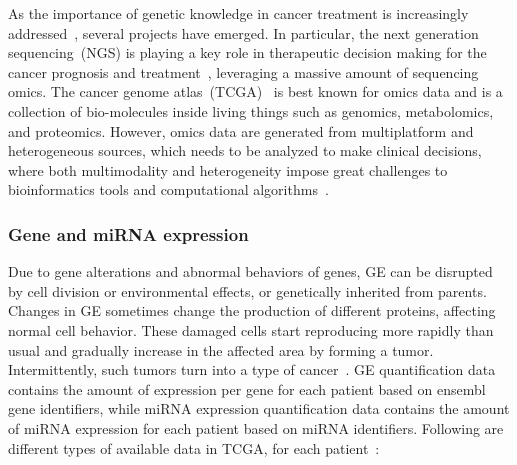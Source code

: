 \hspace*{3.5mm} As the importance of genetic knowledge in cancer treatment is increasingly addressed~\cite{15Wu}, several projects have emerged. In particular, the next generation sequencing~(NGS) is playing a key role in therapeutic decision making for the cancer prognosis and treatment~\cite{jha2017towards}, leveraging a massive amount of sequencing omics. The cancer genome atlas~(TCGA)~\cite{tomczak2015cancer} is best known for omics data and is a collection of bio-molecules inside living things such as genomics, metabolomics, and proteomics. However, omics data are generated from multiplatform and heterogeneous sources, which needs to be analyzed to make clinical decisions, where both multimodality and heterogeneity impose great challenges to bioinformatics tools and computational algorithms~\cite{karimACCESS2019,karimBIB2019}. 

\subsubsection{Gene and miRNA expression}
Due to  gene alterations and abnormal behaviors of genes, GE can be disrupted by cell division or environmental effects, or genetically inherited from parents. Changes in GE sometimes change the production of different proteins, affecting normal cell behavior. These damaged cells start reproducing more rapidly than usual and gradually increase in the affected area by forming a tumor. Intermittently, such tumors turn into a type of cancer~\cite{zuo2019identification,24Podolsky}. GE quantification data contains the amount of expression per gene for each patient based on ensembl gene identifiers, while miRNA expression quantification data contains the amount of miRNA expression for each patient based on miRNA identifiers. Following are different types of available data in TCGA, for each patient~\cite{ncbi1,ncbi2}: 

